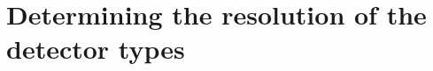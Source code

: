 \appendix
\section{Determining the resolution of the detector types}
\label{sec:ResDetermination}




